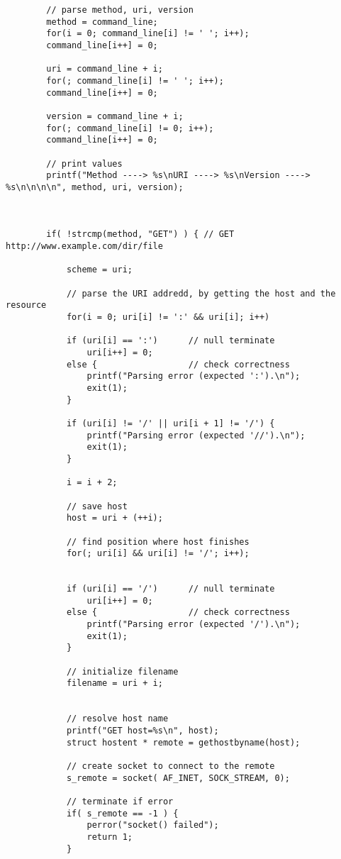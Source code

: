 \begin{lstlisting}
        // parse method, uri, version
        method = command_line;
        for(i = 0; command_line[i] != ' '; i++);
        command_line[i++] = 0;

        uri = command_line + i;
        for(; command_line[i] != ' '; i++);
        command_line[i++] = 0;

        version = command_line + i;
        for(; command_line[i] != 0; i++);
        command_line[i++] = 0;

        // print values
        printf("Method ----> %s\nURI ----> %s\nVersion ----> %s\n\n\n\n", method, uri, version);



        if( !strcmp(method, "GET") ) { // GET http://www.example.com/dir/file

            scheme = uri;

            // parse the URI addredd, by getting the host and the resource
            for(i = 0; uri[i] != ':' && uri[i]; i++)

            if (uri[i] == ':')      // null terminate
                uri[i++] = 0;
            else {                  // check correctness
                printf("Parsing error (expected ':').\n");
                exit(1);
            }

            if (uri[i] != '/' || uri[i + 1] != '/') {
                printf("Parsing error (expected '//').\n");
                exit(1);
            }

            i = i + 2;

            // save host
            host = uri + (++i);

            // find position where host finishes
            for(; uri[i] && uri[i] != '/'; i++);


            if (uri[i] == '/')      // null terminate
                uri[i++] = 0;
            else {                  // check correctness
                printf("Parsing error (expected '/').\n");
                exit(1);
            }

            // initialize filename
            filename = uri + i;


            // resolve host name
            printf("GET host=%s\n", host);
            struct hostent * remote = gethostbyname(host);

            // create socket to connect to the remote
            s_remote = socket( AF_INET, SOCK_STREAM, 0);

            // terminate if error
            if( s_remote == -1 ) {
                perror("socket() failed");
                return 1;
            }


\end{lstlisting}
